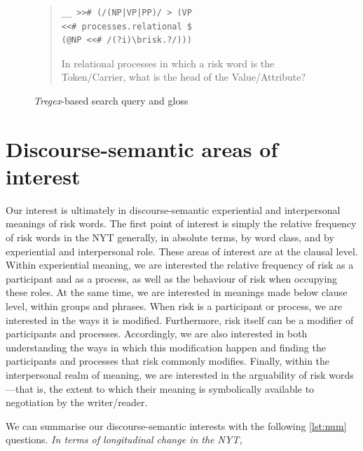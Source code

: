 
\begin{figure}
\begin{quote}
\begin{multicols}{2}
\begin{verbatim}
__ >># (/(NP|VP|PP)/ > (VP
<<# processes.relational $ 
(@NP <<# /(?i)\brisk.?/)))
\end{verbatim}
\noindent In relational processes in which a risk word is the Token/Carrier, what is the head of the Value\slash Attribute?
\end{multicols}
\end{quote}
\caption{\emph{Tregex}-based search query and gloss}
\label{fig:glossed}
\end{figure}

\section{Discourse-semantic areas of interest}

Our interest is ultimately in discourse-semantic experiential and interpersonal meanings of risk words. The first point of interest is simply the relative frequency of risk words in the NYT generally, in absolute terms, by word class, and by experiential and interpersonal role. These areas of interest are at the clausal level. Within experiential meaning, we are interested the relative frequency of risk as a participant and as a process, as well as the behaviour of risk when occupying these roles. At the same time, we are interested in meanings made below clause level, within groups and phrases. When risk is a participant or process, we are interested in the ways it is modified. Furthermore, risk itself can be a modifier of participants and processes. Accordingly, we are also interested in both understanding the ways in which this modification happen and finding the participants and processes that risk commonly modifies. Finally, within the interpersonal realm of meaning, we are interested in the arguability of risk words---that is, the extent to which their meaning is symbolically available to negotiation by the writer\slash reader.

We can summarise our discourse-semantic interests with the following \ref{lst:num} questions. \emph{In terms of longitudinal change in the NYT,}

